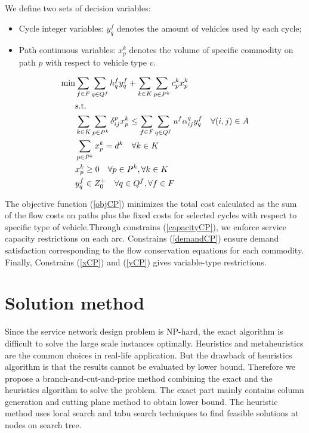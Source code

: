 \documentclass[11pt,nonblindrev,fleqn]{article}
\begin{document}
We define two sets of decision variables:
\begin{itemize}
  \item Cycle integer variables: $y_q^f$ denotes the amount of vehicles used by each cycle;
  \item Path continuous variables: $x_p^k$ denotes the volume of specific commodity on path $p$ with respect to vehicle type $v$.
\end{itemize}

\begin{align}
  \min &    \sum_{f\in F}\sum_{q\in Q^f}h_q^f y_q^f  +   \sum_{k\in K}\sum_{p\in P^k}c_p^k x_p^k  \label{objCP}    \\
         & \rm{s.t.} \nonumber \\
         &     \sum_{k\in K}\sum_{p\in P^k}\delta_{ij}^p x_p^k \leq  \sum_{f\in F}\sum_{q\in Q^f}u^f \alpha_{ij}^q y_q^f      \quad \forall (i,j)\in A \label{capacityCP}\\
         &     \sum_{p\in P^k}x_p^k = d^k      \quad       \forall k\in K  \label{demandCP}    \\
         &      x_p^k \geq 0        \quad       \forall p\in P^k,\forall k\in K     \label{xCP} \\
         &      y_q^f \in Z_0^+     \quad       \forall q\in Q^f, \forall f\in F    \label{yCP}
\end{align}

The objective function (\ref{objCP}) minimizes the total cost calculated as the sum of the flow costs on paths plus the fixed costs for selected cycles with respect to specific type of vehicle.Through constrains (\ref{capacityCP}), we enforce service capacity restrictions on each arc. Constrains (\ref{demandCP}) ensure demand satisfaction corresponding to the flow conservation equations for each commodity.  Finally, Constrains (\ref{xCP}) and (\ref{yCP}) gives variable-type restrictions.

\section{Solution method}
Since the service network design problem is NP-hard, the exact algorithm is difficult to solve the large scale instances optimally. Heuristics and metaheuristics are the common choices in real-life application. But the drawback of heuristics algorithm is that the results cannot be evaluated by lower bound. Therefore we propose a branch-and-cut-and-price method combining the exact and the heuristics algorithm to solve the problem. The exact part mainly contains column generation and cutting plane method to obtain lower bound. The heuristic method uses local search and tabu search techniques to find feasible solutions at nodes on search tree.
\end{document}
